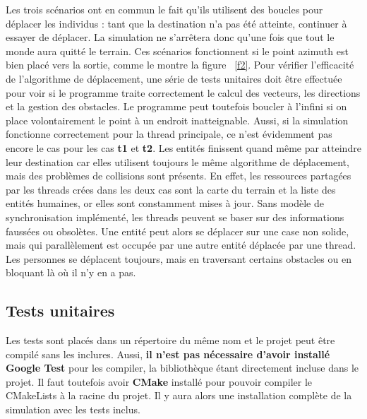 \documentclass[11pt]{article} %
\begin{document}
Les trois scénarios ont en commun le fait qu'ils utilisent des boucles pour déplacer les individus : tant que la destination n'a pas été atteinte, continuer à essayer de déplacer. La simulation ne s'arrêtera donc qu'une fois que tout le monde aura quitté le terrain. Ces scénarios fonctionnent si le point azimuth est bien placé vers la sortie, comme le montre la figure ~\ref{f2}. 
Pour vérifier l'efficacité de l'algorithme de déplacement, une série de tests unitaires doit être effectuée pour voir si le programme traite correctement le calcul des vecteurs, les directions et la gestion des obstacles. 
Le programme peut toutefois boucler à l'infini si on place volontairement le point à un endroit inatteignable.
Aussi, si la simulation fonctionne correctement pour la thread principale, ce n'est évidemment pas encore le cas pour les cas \textbf{t1} et \textbf{t2}. Les entités finissent quand même par atteindre leur destination car elles utilisent toujours le même algorithme de déplacement, mais des problèmes de collisions sont présents. 
En effet, les ressources partagées par les threads crées dans les deux cas sont la carte du terrain et la liste des entités humaines, or elles sont constamment mises à jour. Sans modèle de synchronisation implémenté, les threads peuvent se baser sur des informations faussées ou obsolètes. Une entité peut alors se déplacer sur une case non solide, mais qui parallèlement est occupée par une autre entité déplacée par une thread. Les personnes se déplacent toujours, mais en traversant certains obstacles ou en bloquant là où il n'y en a pas.

\subsection{Tests unitaires}
Les tests sont placés dans un répertoire du même nom et le projet peut être compilé sans les inclures. Aussi, \textbf{il n'est pas nécessaire d'avoir installé Google Test} pour les compiler, la bibliothèque étant directement incluse dans le projet. Il faut toutefois avoir \textbf{CMake} installé pour pouvoir compiler le CMakeLists à la racine du projet. Il y aura alors une installation complète de la simulation avec les tests inclus. \\
\end{document}
